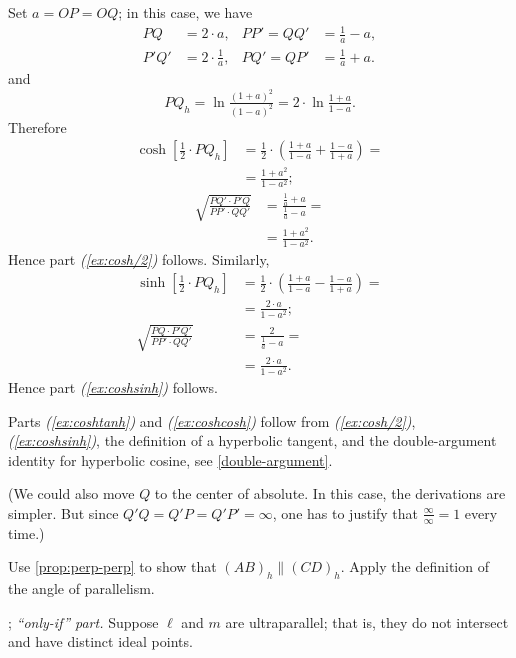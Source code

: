 Set $a=OP=OQ$; in this case, we have
\begin{align*}
PQ&=2\cdot a,
&
PP'=QQ'&=\tfrac1a-a,
\\
P'Q'&=2\cdot \tfrac1a,
&
PQ'=QP'&=\tfrac1a+a.
\end{align*}
and 
\[PQ_h=\ln \tfrac{(1+a)^2}{(1-a)^2}=2\cdot \ln \tfrac{1+a}{1-a}.\]
Therefore
\begin{align*}
\cosh[\tfrac12\cdot PQ_h]
&=\tfrac12\cdot(\tfrac{1+a}{1-a}+\tfrac{1-a}{1+a})=
\\
&=\tfrac{1+a^2}{1-a^2};
\end{align*} 
\begin{align*}
\sqrt{\frac{PQ'\cdot P'Q}{PP'\cdot QQ'}}
&=\frac{\frac1a+a}{\frac1a-a}=
\\
&=\tfrac{1+a^2}{1-a^2}.
\end{align*} 
Hence part \textit{(\ref{ex:cosh/2})} follows.
Similarly,
\begin{align*}
\sinh[\tfrac12\cdot PQ_h]
&=\tfrac12\cdot\left(\tfrac{1+a}{1-a}-\tfrac{1-a}{1+a}\right)=
\\
&=\tfrac{2\cdot a}{1-a^2};
\\
\sqrt{\frac{PQ\cdot P'Q'}{PP'\cdot QQ'}}
&=\frac{2}{\frac1a-a}=
\\
&=\tfrac{2\cdot a}{1-a^2}.
\end{align*} 
Hence part \textit{(\ref{ex:coshsinh})} follows.

Parts \textit{(\ref{ex:coshtanh})} and \textit{(\ref{ex:coshcosh})} follow from \textit{(\ref{ex:cosh/2})}, \textit{(\ref{ex:coshsinh})}, the definition of a hyperbolic tangent, and the double-argument identity for hyperbolic cosine, see \ref{double-argument}.

(We could also move $Q$ to the center of absolute.
In this case, the derivations are simpler.
But since $Q'Q=Q'P=Q'P'=\infty$, one has to justify that $\tfrac\infty\infty=1$ every time.)

\setcounter{eqtn}{0}

Use \ref{prop:perp-perp} to show that $(AB)_h\parallel (CD)_h$.
Apply the definition of the angle of parallelism.

\parbf{\ref{ex:ultra-parallel}}; \textit{``only-if'' part.}
Suppose $\ell$ and $m$ are ultraparallel; that is, they do not intersect and have distinct ideal points.

